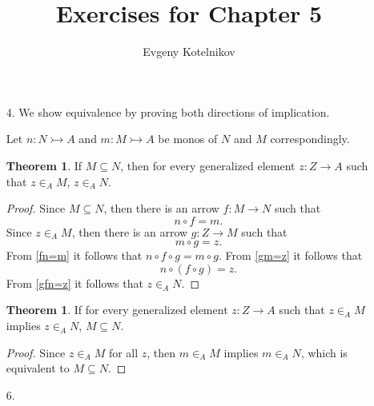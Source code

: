 \documentclass[12pt]{article}
\author{Evgeny Kotelnikov}
\title{Exercises for Chapter 5}
\date{}
\theoremstyle{definition}
\begin{document}
\maketitle

\begin{enumerate}
  \item[4.]
    We show equivalence by proving both directions of implication.

    Let $n : N \rightarrowtail A$ and $m : M \rightarrowtail A$ be monos of $N$ and $M$ correspondingly.

    \newtheorem*{a->b}{Theorem}
    \begin{a->b}If $M \subseteq N$, then for every generalized element $z : Z \to A$ such that $z \in_A M$, $z \in_A N$.\end{a->b}
    \begin{proof}
      Since $M \subseteq N$, then there is an arrow $f : M \to N$ such that \begin{equation}\label{fn=m}n \circ f = m.\end{equation} Since $z \in_A M$, then there is an arrow $g : Z \to M$ such that \begin{equation}\label{gm=z}m \circ g = z.\end{equation}
      From \ref{fn=m} it follows that $n \circ f \circ g = m \circ g$. From \ref{gm=z} it follows that \begin{equation}\label{gfn=z}n \circ (f \circ g) = z.\end{equation}
      From \ref{gfn=z} it follows that $z \in_A N$.
    \end{proof}

    \newtheorem*{b->a}{Theorem}
    \begin{b->a}If for every generalized element $z : Z \to A$ such that $z \in_A M$ implies $z \in_A N$, $M \subseteq N$.\end{b->a}
    \begin{proof}
      Since $z \in_A M$ for all $z$, then $m \in_A M$ implies $m \in_A N$, which is equivalent to $M \subseteq N$.
    \end{proof}

  \item[6.]
    \begin{figure}[h!]
      \centering
\end{figure}
\end{enumerate}
\end{document}
